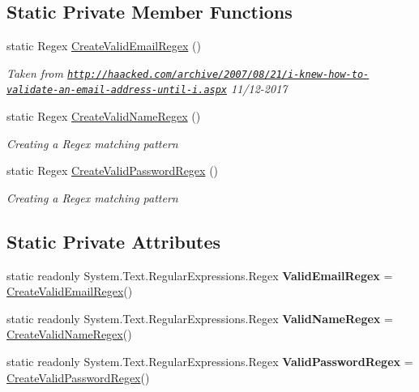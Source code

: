 \subsection*{Static Private Member Functions}
\begin{DoxyCompactItemize}
\item 
static Regex \hyperlink{class_ramboell_1_1i_o_s_1_1_validator_a6e258a73cdcd1a90685fc026e7e92ff3}{Create\+Valid\+Email\+Regex} ()
\begin{DoxyCompactList}\small\item\em Taken from \href{http://haacked.com/archive/2007/08/21/i-knew-how-to-validate-an-email-address-until-i.aspx}{\tt http\+://haacked.\+com/archive/2007/08/21/i-\/knew-\/how-\/to-\/validate-\/an-\/email-\/address-\/until-\/i.\+aspx} 11/12-\/2017 \end{DoxyCompactList}\item 
static Regex \hyperlink{class_ramboell_1_1i_o_s_1_1_validator_a93026ab8f508ce6cb3e8b666b1c4b1ce}{Create\+Valid\+Name\+Regex} ()
\begin{DoxyCompactList}\small\item\em Creating a Regex matching pattern \end{DoxyCompactList}\item 
static Regex \hyperlink{class_ramboell_1_1i_o_s_1_1_validator_abec24ab9e7a001acd05cc37a9ffdb26b}{Create\+Valid\+Password\+Regex} ()
\begin{DoxyCompactList}\small\item\em Creating a Regex matching pattern \end{DoxyCompactList}\end{DoxyCompactItemize}
\subsection*{Static Private Attributes}
\begin{DoxyCompactItemize}
\item 
\mbox{\label{class_ramboell_1_1i_o_s_1_1_validator_a5e438b906572b3a481a1a6e983e9602f}} 
static readonly System.\+Text.\+Regular\+Expressions.\+Regex {\bfseries Valid\+Email\+Regex} = \hyperlink{class_ramboell_1_1i_o_s_1_1_validator_a6e258a73cdcd1a90685fc026e7e92ff3}{Create\+Valid\+Email\+Regex}()
\item 
\mbox{\label{class_ramboell_1_1i_o_s_1_1_validator_a40ce762de26bb0607852bb2af896c75f}} 
static readonly System.\+Text.\+Regular\+Expressions.\+Regex {\bfseries Valid\+Name\+Regex} = \hyperlink{class_ramboell_1_1i_o_s_1_1_validator_a93026ab8f508ce6cb3e8b666b1c4b1ce}{Create\+Valid\+Name\+Regex}()
\item 
\mbox{\label{class_ramboell_1_1i_o_s_1_1_validator_ad7f61c9214d32c8c260354f6979edc58}} 
static readonly System.\+Text.\+Regular\+Expressions.\+Regex {\bfseries Valid\+Password\+Regex} = \hyperlink{class_ramboell_1_1i_o_s_1_1_validator_abec24ab9e7a001acd05cc37a9ffdb26b}{Create\+Valid\+Password\+Regex}()
\end{DoxyCompactItemize}


